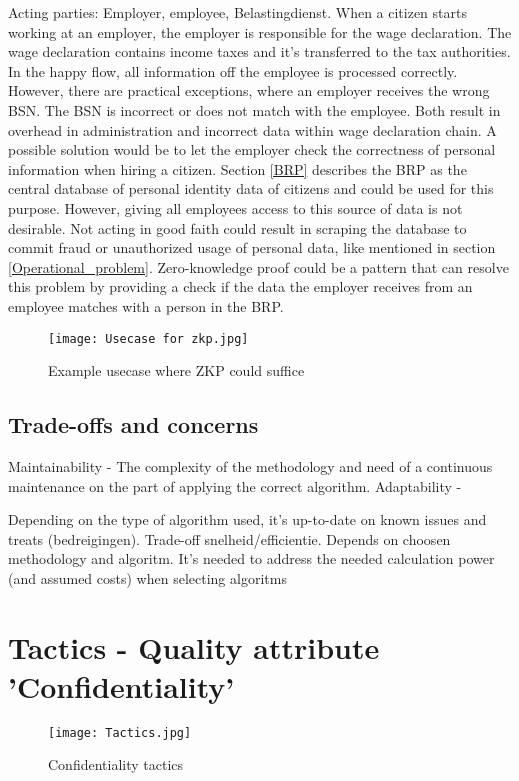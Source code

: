 Acting parties: Employer, employee, Belastingdienst.
When a citizen starts working at an employer, the employer is responsible for the wage declaration. The wage declaration contains income taxes and it's transferred to the tax authorities. In the happy flow, all information off the employee is processed correctly. However, there are practical exceptions, where an employer receives the wrong BSN. The BSN is incorrect or does not match with the employee. Both result in overhead in administration and incorrect data within wage declaration chain.
A possible solution would be to let the employer check the correctness of personal information when hiring a citizen. Section \ref{BRP} describes the BRP as the central database of personal identity data of citizens and could be used for this purpose. However, giving all employees access to this source of data is not desirable. Not acting in good faith could result in scraping the database to commit fraud or unauthorized usage of personal data, like mentioned in section \ref{Operational_problem}. Zero-knowledge proof could be a pattern that can resolve this problem by providing a check if the data the employer receives from an employee matches with a person in the BRP. 

\graphicspath{ {./images/} }
\begin{figure}
\centering
\label{fig:ZKP_usecase}
\texttt{[image: Usecase for zkp.jpg]}\\
\caption{Example usecase where ZKP could suffice}
\end{figure}


\subsection{Trade-offs and concerns}
Maintainability - The complexity of the methodology and need of a continuous maintenance on the part of applying the correct algorithm. 
Adaptability - 

Depending on the type of algorithm used, it's up-to-date on known issues and treats (bedreigingen).
Trade-off snelheid/efficientie. Depends on choosen methodology and algoritm. It's needed to address the needed calculation power (and assumed costs) when selecting algoritms 

\section{Tactics - Quality attribute 'Confidentiality'}
\graphicspath{ {./images/} }
\begin{figure}
\centering
\label{fig:Tactics}
\texttt{[image: Tactics.jpg]}\\
\caption{Confidentiality tactics}
\end{figure}

